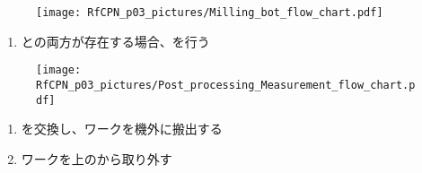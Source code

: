 \begin{figure}[ht]%
\begin{Figbox}[valign=top]%
\texttt{[image: RfCPN\_p03\_pictures/Milling\_bot\_flow\_chart.pdf]}%
\setlength{\abovecaptionskip}{10pt}%
%
\end{Figbox}%
\end{figure}%



\clearpage
\begin{enumerate}[label*=\sarrow]
\item \TopOutcut と\BottomOutcut の両方が存在する場合、\CenterlineEndFaceDifMeasurement を行う
\end{enumerate}


\begin{figure}[ht]%
\begin{FigShortbox}[valign=top]%
\texttt{[image: RfCPN\_p03\_pictures/Post\_processing\_Measurement\_flow\_chart.pdf]}%
\setlength{\abovecaptionskip}{10pt}%
%
\end{FigShortbox}%
\end{figure}%



\clearpage
\begin{enumerate}[label*=\sarrow]
\item \Palette を交換し、ワークを機外に搬出する
\item ワークを\Table 上の\Jig から取り外す
\end{enumerate}


